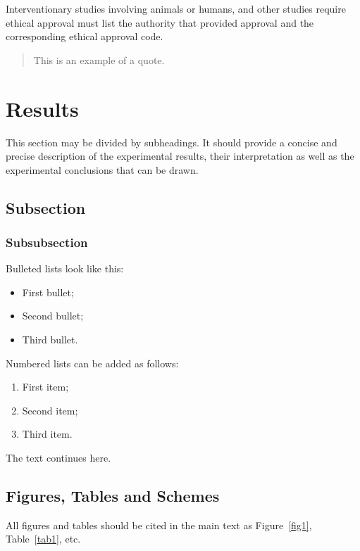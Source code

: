 \documentclass[entropy,article,submit,pdftex,moreauthors]{Definitions/mdpi}
\begin{document}
Interventionary studies involving animals or humans, and other studies require ethical approval must list the authority that provided approval and the corresponding ethical approval code.
\begin{quote}
This is an example of a quote.
\end{quote}

\section{Results}

This section may be divided by subheadings. It should provide a concise and precise description of the experimental results, their interpretation as well as the experimental conclusions that can be drawn.
\subsection{Subsection}
\subsubsection{Subsubsection}

Bulleted lists look like this:
\begin{itemize}
\item	First bullet;
\item	Second bullet;
\item	Third bullet.
\end{itemize}

Numbered lists can be added as follows:
\begin{enumerate}
\item	First item; 
\item	Second item;
\item	Third item.
\end{enumerate}

The text continues here. 

\subsection{Figures, Tables and Schemes}

All figures and tables should be cited in the main text as Figure~\ref{fig1}, Table~\ref{tab1}, etc.
\end{document}
